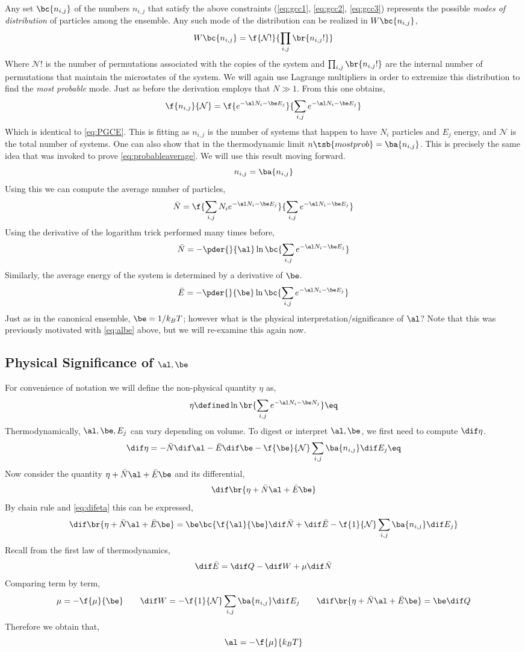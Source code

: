 \documentclass{article}
\begin{document}
{Any set $\bc{n_{i,j}}$ of the numbers $n_{i,j}$ that satisfy the above constraints (\eqref{eq:gcc1}, \eqref{eq:gcc2}, \eqref{eq:gcc3}) represents the possible \textit{modes of distribution} of particles among the ensemble. Any such mode of the distribution can be realized in $W\bc{n_{i,j}}$,
\[ W \bc{n_{i,j}} = \f{\mathcal{N}!}{\prod_{i,j} \br{n_{i,j} !}} \]
Where $\mathcal{N}!$ is the number of permutations associated with the copies of the system and $\prod_{i,j} \br{n_{i,j} !}$ are the internal number of permutations that maintain the microstates of the system. We will again use Lagrange multipliers in order to extremize this distribution to find the \textit{most probable} mode. Just as before the derivation employs that $N \gg 1$. From this one obtains,
\[ \f{n_{i,j}}{\mathcal{N}} =  \f{e^{-\al N_i - \be E_j}}{\sum_{i,j}e^{-\al N_i - \be E_j}}\]
Which is identical to \eqref{eq:PGCE}. This is fitting as $n_{i,j}$ is the number of systems that happen to have $N_i$ particles and $E_j$ energy, and $\mathcal{N}$ is the total number of systems. One can also show that in the thermodynamic limit $n\tsb{most prob} = \ba{n_{i,j}}$. This is precisely the same idea that was invoked to prove \eqref{eq:probableaverage}. We will use this result moving forward.
\[ n_{i,j} = \ba{n_{i,j}} \]
Using this we can compute the average number of particles,
\[ \bar{N} = \f{\sum_{i,j} N_i e^{-\al N_i - \be E_j}}{\sum_{i,j}e^{-\al N_i - \be E_j}} \]
Using the derivative of the logarithm trick performed many times before,
\[ \bar{N} = -\pder{}{\al}\ln \bc{\sum_{i,j} e^{-\al N_i - \be E_j}} \]
Similarly, the average energy of the system is determined by a derivative of $\be$.
\[ \bar{E} = -\pder{}{\be}\ln \bc{\sum_{i,j} e^{-\al N_i - \be E_j}} \]
Just as in the canonical ensemble, $\be = 1/k_B T$; however what is the physical interpretation/significance of $\al$? Note that this was previously motivated with \eqref{eq:albe} above, but we will re-examine this again now.

\subsection{Physical Significance of $\al, \be$}

For convenience of notation we will define the non-physical quantity $\eta$ as,
\[ \eta \defined \ln \br{\sum_{i,j} e^{-\al N_i - \be N_j}} \eq \label{eq:eta}\]
Thermodynamically, $\al, \be, E_j$ can vary depending on volume. To digest or interpret $\al, \be$, we first need to compute $\dif \eta$.
\[ \dif \eta = - \bar{N} \dif \al - \bar{E} \dif \be - \f{\be}{\mathcal{N}} \sum_{i,j} \ba{n_{i,j}} \dif E_j \eq \label{eq:difeta}\]
Now consider the quantity $\eta + \bar{N} \al + \bar{E} \be$ and its differential,
\[ \dif \br{\eta + \bar{N} \al + \bar{E} \be} \]
By chain rule and \eqref{eq:difeta} this can be expressed,
\[ \dif \br{\eta + \bar{N} \al + \bar{E} \be} = \be \bc{ \f{\al}{\be}\dif \bar{N} + \dif \bar{E} -\f{1}{\mathcal{N}} \sum_{i,j} \ba{n_{i,j}} \dif E_j } \]
Recall from the first law of thermodynamics,
\[ \dif \bar{E} = \dif Q - \dif W + \mu \dif \bar{N} \]
Comparing term by term,
\[ \mu = - \f{\mu}{\be} \qquad \dif W = - \f{1}{\mathcal{N}} \sum_{i,j} \ba{n_{i,j}} \dif E_j \qquad \dif \br{\eta + \bar{N} \al + \bar{E} \be} = \be \dif Q\]
Therefore we obtain that,
\[ \al = -\f{\mu}{k_B T} \]
}
\end{document}
